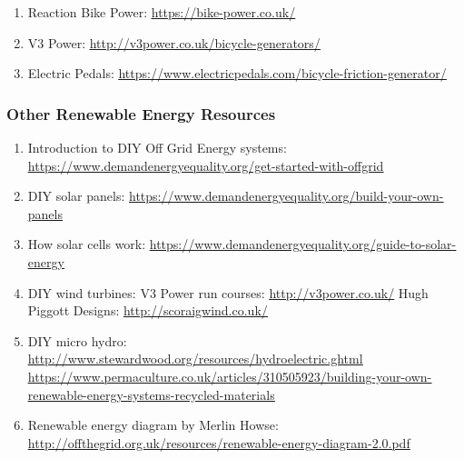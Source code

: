 \documentclass{article}
\theoremstyle{definition}
\theoremstyle{definition}
\theoremstyle{remark}
\begin{document}
    \begin{enumerate}[resume]
      \item Reaction Bike Power: \href{https://bike-power.co.uk/}{\underline{https://bike-power.co.uk/}}
      \item V3 Power: \href{http://v3power.co.uk/bicycle-generators/}{\underline{http://v3power.co.uk/bicycle-generators/}}
      \item Electric Pedals: \href{https://www.electricpedals.com/bicycle-friction-generator/}{\underline{https://www.electricpedals.com/bicycle-friction-generator/}}
    \end{enumerate}
  

  \subsubsection{Other Renewable Energy Resources} %
  \label{ssub:other_renewable_energy_resources}

    \begin{enumerate}[resume]
      \item Introduction to DIY Off Grid Energy systems: \newline
        \href{https://www.demandenergyequality.org/get-started-with-offgrid}{\underline{https://www.demandenergyequality.org/get-started-with-offgrid}}
      \item DIY solar panels: \href{https://www.demandenergyequality.org/build-your-own-panels}{\underline{https://www.demandenergyequality.org/build-your-own-panels}}
      \item How solar cells work: \href{https://www.demandenergyequality.org/guide-to-solar-energy}{\underline{https://www.demandenergyequality.org/guide-to-solar-energy}}
      \item DIY wind turbines: \newline
        V3 Power run courses: \href{http://v3power.co.uk/}{\underline{http://v3power.co.uk/}} \newline
        Hugh Piggott Designs: \href{http://scoraigwind.co.uk/}{\underline{http://scoraigwind.co.uk/}}
      \item DIY micro hydro:  \href{http://www.stewardwood.org/resources/hydroelectric.ghtml}{\underline{http://www.stewardwood.org/resources/hydroelectric.ghtml}} \newline
        \href{https://www.permaculture.co.uk/articles/310505923/building-your-own-renewable-energy-systems-recycled-materials}{\underline{https://www.permaculture.co.uk/articles/310505923/building-your-own-renewable-energy-systems-recycled-materials}}
      \item Renewable energy diagram by Merlin Howse: \newline
        \href{http://offthegrid.org.uk/resources/renewable-energy-diagram-2.0.pdf}{\underline{http://offthegrid.org.uk/resources/renewable-energy-diagram-2.0.pdf}}

    \end{enumerate}
  
\end{document}
